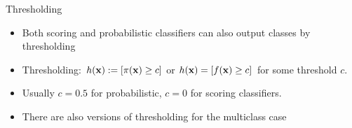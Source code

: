 \documentclass[11pt,compress,t,notes=noshow, xcolor=table]{beamer}
\begin{document}
\begin{frame}{Thresholding}
  
\begin{itemize}
\item Both scoring and probabilistic classifiers can also output classes by thresholding
\item Thresholding: $h(\mathbf{x}):= [\pi(\mathbf{x}) \ge c]$ or $h(\mathbf{x}) = [f(\mathbf{x}) \ge c]$ for some threshold $c$.
\item Usually $c = 0.5$ for probabilistic, $c = 0$ for scoring classifiers.
\item There are also versions of thresholding for the multiclass case

\end{itemize}



\end{frame}
\end{document}
